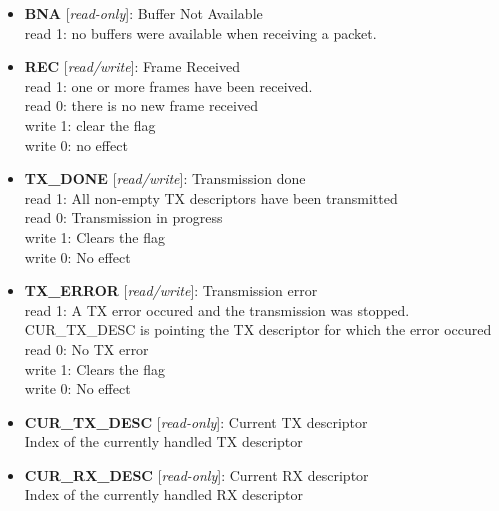 \begin{itemize}
\item \begin{small}
{\bf 
BNA
} [\emph{read-only}]: Buffer Not Available
\\
read 1: no buffers were available when receiving a packet.
\end{small}
\item \begin{small}
{\bf 
REC
} [\emph{read/write}]: Frame Received
\\
read 1: one or more frames have been received. \\                        read 0: there is no new frame received \\				                write 1: clear the flag \\                        write 0: no effect
\end{small}
\item \begin{small}
{\bf 
TX\_DONE
} [\emph{read/write}]: Transmission done
\\
read 1: All non-empty TX descriptors have been transmitted\\				                read 0: Transmission in progress\\				 write 1: Clears the flag\\				 write 0: No effect
\end{small}
\item \begin{small}
{\bf 
TX\_ERROR
} [\emph{read/write}]: Transmission error
\\
read 1: A TX error occured and the transmission was stopped. CUR\_TX\_DESC is pointing the TX descriptor for which the error occured\\				                read 0: No TX error\\				 write 1: Clears the flag\\				 write 0: No effect
\end{small}
\item \begin{small}
{\bf 
CUR\_TX\_DESC
} [\emph{read-only}]: Current TX descriptor
\\
Index of the currently handled TX descriptor
\end{small}
\item \begin{small}
{\bf 
CUR\_RX\_DESC
} [\emph{read-only}]: Current RX descriptor
\\
Index of the currently handled RX descriptor
\end{small}
\end{itemize}
